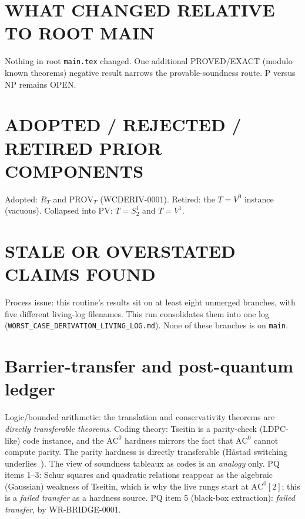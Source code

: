 \documentclass[11pt]{article}
\theoremstyle{definition}
\begin{document}
\section*{WHAT CHANGED RELATIVE TO ROOT MAIN}
Nothing in root \texttt{main.tex} changed. One additional PROVED/EXACT (modulo known theorems) negative result
narrows the provable-soundness route. P versus NP remains OPEN.

\section*{ADOPTED / REJECTED / RETIRED PRIOR COMPONENTS}
Adopted: $R_T$ and $\mathrm{PROV}_T$ (WCDERIV-0001). Retired: the $T=V^0$ instance (vacuous). Collapsed into PV: $T=S^1_2$ and $T=V^1$.

\section*{STALE OR OVERSTATED CLAIMS FOUND}
Process issue: this routine's results sit on at least eight unmerged branches, with five different
living-log filenames. This run consolidates them into one log (\texttt{WORST\_CASE\_DERIVATION\_LIVING\_LOG.md}).
None of these branches is on \texttt{main}.

\section*{Barrier-transfer and post-quantum ledger}
Logic/bounded arithmetic: the translation and conservativity theorems are \emph{directly transferable theorems}.
Coding theory: Tseitin is a parity-check (LDPC-like) code instance, and the $\mathrm{AC}^0$ hardness
mirrors the fact that $\mathrm{AC}^0$ cannot compute parity. The parity hardness is directly transferable
(H\aa stad switching underlies~\cite{BS02}). The view of soundness tableaux as codes is an \emph{analogy} only.
PQ items 1--3: Schur squares and quadratic relations reappear as the algebraic (Gaussian) weakness of Tseitin,
which is why the live rungs start at $\mathrm{AC}^0[2]$; this is a \emph{failed transfer} as a hardness source.
PQ item 5 (black-box extraction): \emph{failed transfer}, by WR-BRIDGE-0001.
\end{document}
